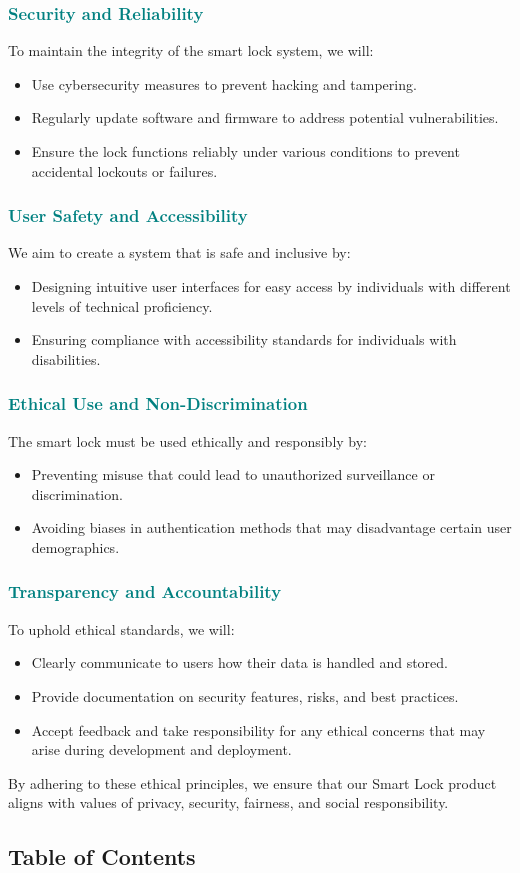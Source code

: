 \documentclass[a4paper,12pt]{report}
\begin{document}
\textcolor{teal}{\subsubsection{Security and Reliability}}
To maintain the integrity of the smart lock system, we will:
\begin{itemize}
    \item Use cybersecurity measures to prevent hacking and tampering.
    \item Regularly update software and firmware to address potential vulnerabilities.
    \item Ensure the lock functions reliably under various conditions to prevent accidental lockouts or failures.
\end{itemize}

\textcolor{teal}{\subsubsection{User Safety and Accessibility}}
We aim to create a system that is safe and inclusive by:
\begin{itemize}
    \item Designing intuitive user interfaces for easy access by individuals with different levels of technical proficiency.
    \item Ensuring compliance with accessibility standards for individuals with disabilities.
\end{itemize}

\textcolor{teal}{\subsubsection{Ethical Use and Non-Discrimination}}
The smart lock must be used ethically and responsibly by:
\begin{itemize}
    \item Preventing misuse that could lead to unauthorized surveillance or discrimination.
    \item Avoiding biases in authentication methods that may disadvantage certain user demographics.
\end{itemize}

\textcolor{teal}{\subsubsection{Transparency and Accountability}}
To uphold ethical standards, we will:
\begin{itemize}
    \item Clearly communicate to users how their data is handled and stored.
    \item Provide documentation on security features, risks, and best practices.
    \item Accept feedback and take responsibility for any ethical concerns that may arise during development and deployment.
\end{itemize}

By adhering to these ethical principles, we ensure that our Smart Lock product aligns with values of privacy, security, fairness, and social responsibility.

\subsection{Table of Contents}
\end{document}
